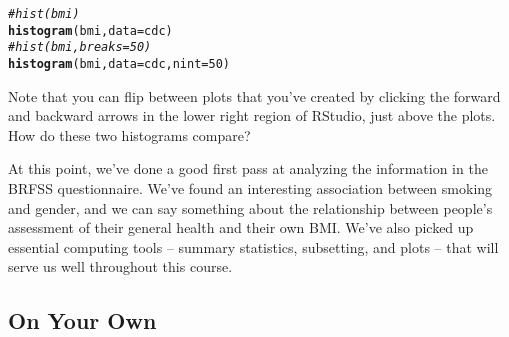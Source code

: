 \documentclass{article}\usepackage[]{graphicx}\usepackage[]{color}
\makeatletter
\newcommand{\hlnum}[1]{\textcolor[rgb]{0.686,0.059,0.569}{#1}}%
\newcommand{\hlcom}[1]{\textcolor[rgb]{0.678,0.584,0.686}{\textit{#1}}}%
\newcommand{\hlopt}[1]{\textcolor[rgb]{0,0,0}{#1}}%
\newcommand{\hlstd}[1]{\textcolor[rgb]{0.345,0.345,0.345}{#1}}%
\newcommand{\hlkwc}[1]{\textcolor[rgb]{0.333,0.667,0.333}{#1}}%
\newcommand{\hlkwd}[1]{\textcolor[rgb]{0.737,0.353,0.396}{\textbf{#1}}}%
\newenvironment{kframe}{%
 \def\at@end@of@kframe{}%
 \ifinner\ifhmode%
  \def\at@end@of@kframe{\end{minipage}}%
  \begin{minipage}{\columnwidth}%
 \fi\fi%
 \def\FrameCommand##1{\hskip\@totalleftmargin \hskip-\fboxsep
 \colorbox{shadecolor}{##1}\hskip-\fboxsep
     \hskip-\linewidth \hskip-\@totalleftmargin \hskip\columnwidth}%
 \MakeFramed {\advance\hsize-\width
   \@totalleftmargin\z@ \linewidth\hsize
   \@setminipage}}%
 {\par\unskip\endMakeFramed%
 \at@end@of@kframe}
\newenvironment{knitrout}{}{} %
\makeatother
\begin{document}
\begin{knitrout}
\color{fgcolor}\begin{kframe}
\begin{alltt}
\hlcom{# hist(bmi)}
\hlkwd{histogram}\hlstd{(}\hlopt{\mytilde}\hlstd{bmi,} \hlkwc{data} \hlstd{= cdc)}
\hlcom{# hist(bmi, breaks = 50)}
\hlkwd{histogram}\hlstd{(}\hlopt{\mytilde}\hlstd{bmi,} \hlkwc{data} \hlstd{= cdc,} \hlkwc{nint} \hlstd{=} \hlnum{50}\hlstd{)}
\end{alltt}
\end{kframe}
\end{knitrout}


Note that you can flip between plots that you've created by clicking the forward and backward arrows in the lower right region of RStudio, just above the plots.  How do these two histograms compare?

At this point, we've done a good first pass at analyzing the information in the BRFSS questionnaire.  We've found an interesting association between smoking and gender, and we can say something about the relationship between people's assessment of their general health and their own BMI.  We've also picked up essential computing tools -- summary statistics, subsetting, and plots -- that will serve us well throughout this course.

\vfill

\subsection*{On Your Own}
\end{document}
